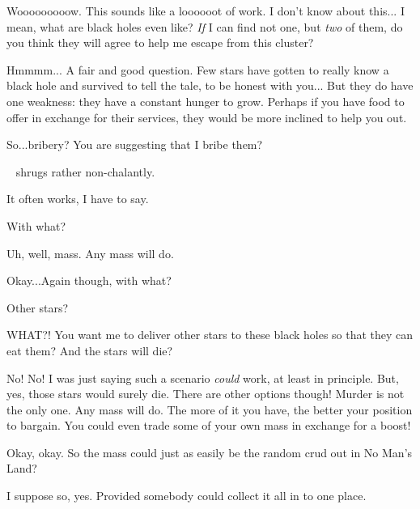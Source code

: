 \documentclass[main.tex]{subfiles}
\begin{document}
\par \Sterope Wooooooooow.  This sounds like a loooooot of work.  I don't know about this... I mean, what are black holes even like?  \textit{If} I can find not one, but \textit{two} of them, do you think they will agree to help me escape from this cluster?

\par \Enrico Hmmmm... A fair and good question.  Few stars have gotten to really know a black hole and survived to tell the tale, to be honest with you... But they do have one weakness:  they have a constant hunger to grow.  Perhaps if you have food to offer in exchange for their services, they would be more inclined to help you out.  

\par \Sterope  So...bribery?  You are suggesting that I bribe them?  

\par \nar \rmenrico~ shrugs rather non-chalantly.

\par \Enrico It often works, I have to say.

\par \Sterope With what?

\par \Enrico Uh, well, mass.  Any mass will do.

\par \Sterope Okay...Again though, with what?

\par \Enrico Other stars?

\par \Sterope WHAT?! You want me to deliver other stars to these black holes so that they can eat them?  And the stars will die?

\par \Enrico No! No! I was just saying such a scenario \textit{could} work, at least in principle.  But, yes, those stars would surely die.  There are other options though!  Murder is not the only one.  Any mass will do.  The more of it you have, the better your position to bargain.  You could even trade some of your own mass in exchange for a boost!

\par \Sterope Okay, okay. So the mass could just as easily be the random crud out in No Man's Land?  

\par \Enrico I suppose so, yes.  Provided somebody could collect it all in to one place.
\end{document}
